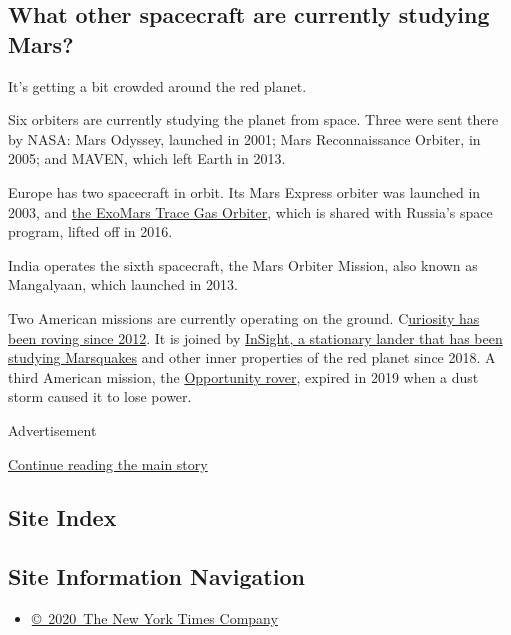 \hypertarget{what-other-spacecraft-are-currently-studying-mars}{%
\subsection{What other spacecraft are currently studying
Mars?}\label{what-other-spacecraft-are-currently-studying-mars}}

It's getting a bit crowded around the red planet.

Six orbiters are currently studying the planet from space. Three were
sent there by NASA: Mars Odyssey, launched in 2001; Mars Reconnaissance
Orbiter, in 2005; and MAVEN, which left Earth in 2013.

Europe has two spacecraft in orbit. Its Mars Express orbiter was
launched in 2003, and
\href{https://www.nytimes.com/2019/04/10/science/mars-methane-life.html}{the
ExoMars Trace Gas Orbiter}, which is shared with Russia's space program,
lifted off in 2016.

India operates the sixth spacecraft, the Mars Orbiter Mission, also
known as Mangalyaan, which launched in 2013.

Two American missions are currently operating on the ground.
C\href{https://www.nytimes.com/2019/06/22/science/nasa-mars-rover-life.html}{uriosity
has been roving since 2012}. It is joined by
\href{https://www.nytimes.com/interactive/2018/05/01/science/mars-nasa-insight-ar-3d-ul.html}{InSight,
a stationary lander that has been studying Marsquakes} and other inner
properties of the red planet since 2018. A third American mission, the
\href{https://www.nytimes.com/2019/02/13/science/mars-opportunity-rover-dead.html}{Opportunity
rover}, expired in 2019 when a dust storm caused it to lose power.

Advertisement

\protect\hyperlink{after-bottom}{Continue reading the main story}

\hypertarget{site-index}{%
\subsection{Site Index}\label{site-index}}

\hypertarget{site-information-navigation}{%
\subsection{Site Information
Navigation}\label{site-information-navigation}}

\begin{itemize}
\tightlist
\item
  \href{https://help.nytimes.com/hc/en-us/articles/115014792127-Copyright-notice}{©~2020~The
  New York Times Company}
\end{itemize}


